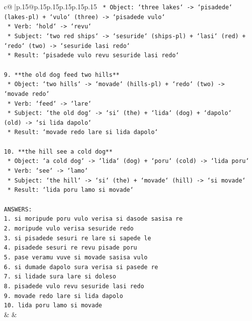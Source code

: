 \documentclass{article}
\begin{document}
{\begin{supertabular}{c@{$\;$}|p{.15\linewidth}@{}p{.15\linewidth}p{.15\linewidth}p{.15\linewidth}p{.15\linewidth}p{.15\linewidth}}
{{{\texttt{    *   Object: `three lakes` {-}> `pisadede` (lakes{-}pl) + `vulo` (three) {-}> `pisadede vulo`} \\
\texttt{    *   Verb: `hold` {-}> `revu`} \\
\texttt{    *   Subject: `two red ships` {-}> `sesuride` (ships{-}pl) + `lasi` (red) + `redo` (two) {-}> `sesuride lasi redo`} \\
\texttt{    *   Result: `pisadede vulo revu sesuride lasi redo`} \\
\\ 
\texttt{9.  **the old dog feed two hills**} \\
\texttt{    *   Object: `two hills` {-}> `movade` (hills{-}pl) + `redo` (two) {-}> `movade redo`} \\
\texttt{    *   Verb: `feed` {-}> `lare`} \\
\texttt{    *   Subject: `the old dog` {-}> `si` (the) + `lida` (dog) + `dapolo` (old) {-}> `si lida dapolo`} \\
\texttt{    *   Result: `movade redo lare si lida dapolo`} \\
\\ 
\texttt{10. **the hill see a cold dog**} \\
\texttt{    *   Object: `a cold dog` {-}> `lida` (dog) + `poru` (cold) {-}> `lida poru`} \\
\texttt{    *   Verb: `see` {-}> `lamo`} \\
\texttt{    *   Subject: `the hill` {-}> `si` (the) + `movade` (hill) {-}> `si movade`} \\
\texttt{    *   Result: `lida poru lamo si movade`} \\
\\ 
\texttt{ANSWERS:} \\
\texttt{1. si moripude poru vulo verisa si dasode sasisa re} \\
\texttt{2. moripude vulo verisa sesuride redo} \\
\texttt{3. si pisadede sesuri re lare si sapede le} \\
\texttt{4. pisadede sesuri re revu pisade poru} \\
\texttt{5. pase veramu vuve si movade sasisa vulo} \\
\texttt{6. si dumade dapolo sura verisa si pasede re} \\
\texttt{7. si lidade sura lare si doleso} \\
\texttt{8. pisadede vulo revu sesuride lasi redo} \\
\texttt{9. movade redo lare si lida dapolo} \\
\texttt{10. lida poru lamo si movade} \\
            }
        }
    }
    & & \\ \\


\end{supertabular}}
\end{document}
